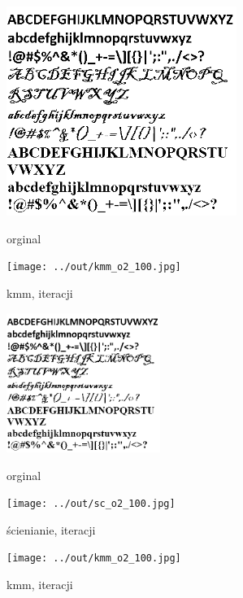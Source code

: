 \documentclass[a4paper,12pt]{article}
\begin{document}
\begin{figure}[h!]
\begin{minipage}[t]{7.5cm}
\begin{center}
\includegraphics[width=7.5cm]{../in/o2.jpg}
\caption{orginal}
\end{center}
\end{minipage}
\hfill
\begin{minipage}[t]{7.5cm}
\begin{center}
\texttt{[image: ../out/kmm\_o2\_100.jpg]}
\caption{kmm, \protect iteracji}
\end{center}
\end{minipage}
\end{figure}

\begin{figure}[h!]
\begin{minipage}[t]{5cm}
\begin{center}
\includegraphics[width=5cm]{../in/o2.jpg}
\caption{orginal}
\end{center}
\end{minipage}
\hfill
\begin{minipage}[t]{5cm}
\begin{center}
\texttt{[image: ../out/sc\_o2\_100.jpg]}
\caption{ścienianie, \protect iteracji}
\end{center}
\end{minipage}
\hfill
\begin{minipage}[t]{5cm}
\begin{center}	
\texttt{[image: ../out/kmm\_o2\_100.jpg]}
\caption{kmm, \protect iteracji}	
\end{center}
\end{minipage}
\end{figure}
\end{document}
